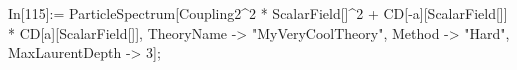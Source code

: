 In[115]:= ParticleSpectrum[Coupling2^2 * ScalarField[]^2 + CD[-a][ScalarField[]] * CD[a][ScalarField[]], TheoryName -> "MyVeryCoolTheory", Method -> "Hard", MaxLaurentDepth -> 3]; 